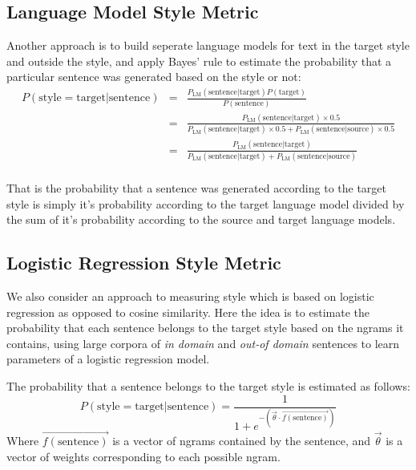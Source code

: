 \documentclass[10pt,a5paper,twoside]{article}
\begin{document}
\subsection{Language Model Style Metric}
Another approach is to build seperate language models for text in the target style and outside the style, and apply Bayes' rule to estimate
the probability that a particular sentence was generated based on the style or not:
\begin{eqnarray*}
P(\text{style}=\text{target}|\text{sentence}) 
& = & \frac{P_\text{LM}(\text{sentence}|\text{target}) P(\text{target})}{P(\text{sentence})} \\
& = & \frac{P_\text{LM}(\text{sentence}|\text{target}) \times 0.5}{P_\text{LM}(\text{sentence}|\text{target}) \times 0.5 + P_\text{LM}(\text{sentence}|\text{source}) \times 0.5} \\
& = & \frac{P_\text{LM}(\text{sentence}|\text{target})}{P_\text{LM}(\text{sentence}|\text{target}) + P_\text{LM}(\text{sentence}|\text{source})} \\
\end{eqnarray*}

That is the probability that a sentence was generated according to the target style is simply it's probability according to the target language model divided by the sum of it's
probability according to the source and target language models.

\subsection{Logistic Regression Style Metric}
We also consider an approach to measuring style which is based on logistic regression as opposed to cosine similarity.
Here the idea is to estimate the probability that each
sentence belongs to the target style based on the ngrams it contains, using large corpora of \emph{in domain} and \emph{out-of domain} sentences to learn  parameters of a logistic regression model.

The probability that a sentence belongs to the target style is estimated as follows:
\[
P(\text{style} = \text{target}|\text{sentence}) = \frac{1}{1 + e^{-\left( \vec{\theta} \cdot \vec{f(\text{sentence})} \right)}}
\]
Where $\vec{f(\text{sentence})}$ is a vector of ngrams contained by the sentence, and $\vec{\theta}$ is a vector of weights corresponding to each possible ngram.
\end{document}

